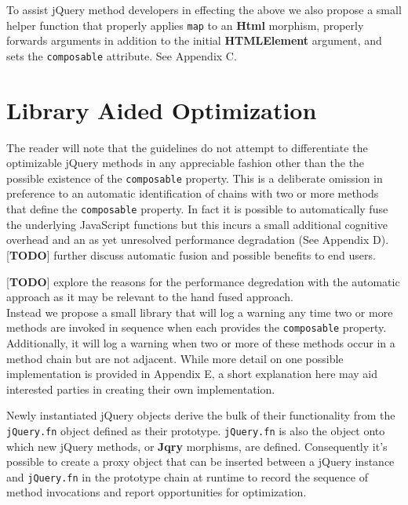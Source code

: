 \documentclass[preprint, leqno]{sigplanconf}
\begin{document}
To assist jQuery method developers in effecting the above we also propose a small helper function that properly applies \verb|map| to an \textbf{Html} morphism, properly forwards arguments in addition to the initial \textbf{HTMLElement} argument, and sets the \verb|composable| attribute. See Appendix C.

\section{Library Aided Optimization} \label{sec:library-aided-optimization}

The reader will note that the guidelines do not attempt to differentiate the optimizable jQuery methods in any appreciable fashion other than the the possible existence of the \verb|composable| property. This is a deliberate omission in preference to an automatic identification of chains with two or more methods that define the \verb|composable| property. In fact it is possible to automatically fuse the underlying JavaScript functions but this incurs a small additional cognitive overhead and an as yet unresolved performance degradation (See Appendix D).
\\

[\textbf{TODO}] further discuss automatic fusion and possible benefits to end users.

[\textbf{TODO}] explore the reasons for the performance degredation with the automatic approach as it may be relevant to the hand fused approach.
\\

Instead we propose a small library that will log a warning any time two or more methods are invoked in sequence when each provides the \verb|composable| property. Additionally, it will log a warning when two or more of these methods occur in a method chain but are not adjacent. While more detail on one possible implementation is provided in Appendix E, a short explanation here may aid interested parties in creating their own implementation.

Newly instantiated jQuery objects derive the bulk of their functionality from the \verb|jQuery.fn| object defined as their prototype. \verb|jQuery.fn| is also the object onto which new jQuery methods, or \textbf{Jqry} morphisms, are defined. Consequently it's possible to create a proxy object that can be inserted between a jQuery instance and \verb|jQuery.fn| in the prototype chain at runtime to record the sequence of method invocations and report opportunities for optimization.
\end{document}
